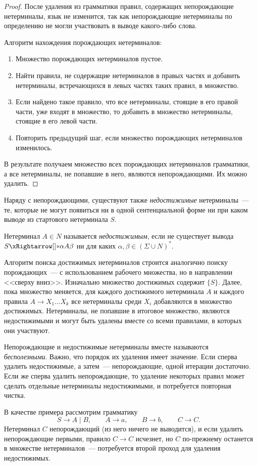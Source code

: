\begin{proof}
    После удаления из грамматики правил, содержащих непорождающие нетерминалы, язык не изменится, так как непорождающие нетерминалы по определению не могли участвовать в выводе какого-либо слова.

    Алгоритм нахождения порождающих нетерминалов:
    \begin{enumerate}
        \item Множество порождающих нетерминалов пустое.
        \item Найти правила, не содержащие нетерминалов в правых частях и добавить нетерминалы, встречающихся в левых частях таких правил, в множество.
        \item Если найдено такое правило, что все нетерминалы, стоящие в его правой части, уже входят в множество, то добавить в множество нетерминалы, стоящие в его левой части.
        \item Повторить предыдущий шаг, если множество порождающих нетерминалов изменилось.
    \end{enumerate}
    В результате получаем множество всех порождающих нетерминалов грамматики, а все нетерминалы, не попавшие в него, являются непорождающими.
    Их можно удалить.
\end{proof}

Наряду с непорождающими, существуют также \emph{недостижимые} нетерминалы~--- те, которые не могут появиться ни в одной сентенциальной форме ни при каком выводе из стартового нетерминала $S$.

\begin{definition}
    Нетерминал $A \in N$ называется \emph{недостижимым}, если не существует вывода $S \derives \alpha A \beta$ ни для каких $\alpha, \beta \in (\Sigma \cup N)^*$.
\end{definition}

Алгоритм поиска достижимых нетерминалов строится аналогично поиску порождающих~--- с использованием рабочего множества, но в направлении <<сверху вниз>>.
Изначально множество достижимых содержит $\{S\}$.
Далее, пока множество меняется, для каждого достижимого нетерминала $A$ и каждого правила $A \to X_1 \dots X_k$ все нетерминалы среди $X_i$ добавляются в множество достижимых.
Нетерминалы, не попавшие в итоговое множество, являются недостижимыми и могут быть удалены вместе со всеми правилами, в которых они участвуют.

Непорождающие и недостижимые нетерминалы вместе называются \emph{бесполезными}.
Важно, что порядок их удаления имеет значение.
Если сперва удалить недостижимые, а затем~--- непорождающие, одной итерации достаточно.
Если же сперва удалить непорождающие, то удаление некоторых правил может сделать отдельные нетерминалы недостижимыми, и потребуется повторная чистка.
\begin{example}
В качестве примера рассмотрим грамматику
\[
    S \to A \mid B,\qquad A \to a,\qquad B \to b,\qquad C \to C.
\]
Нетерминал $C$ непорождающий (из него ничего не выводится), и если удалить непорождающие первыми, правило $C \to C$ исчезнет, но $C$ по-прежнему останется в множестве нетерминалов~--- потребуется второй проход для удаления недостижимых.
\end{example}

